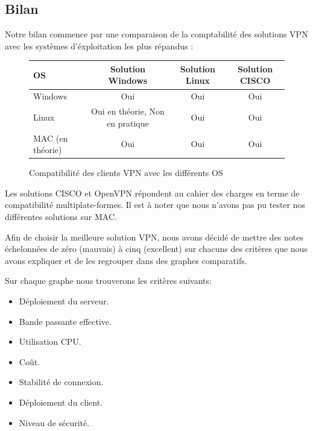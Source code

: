 \subsection{Bilan}

Notre bilan commence par une comparaison de la comptabilité des solutions VPN avec les systèmes d'éxploitation les plus répandus :

\begin{figure}[H]
	\begin{center}
\begin{tabular}{l|c|c|c}
OS & Solution Windows & Solution Linux & Solution CISCO \\
\hline
Windows & Oui & Oui & Oui \\
Linux & Oui en théorie, Non en pratique & Oui & Oui \\
MAC (en théorie) & Oui & Oui & Oui \\
\end{tabular}
	\end{center}
	\caption{Compatibilité des clients VPN avec les différents OS}
	\label{Compatibilité_des_OS}
\end{figure}

Les solutions CISCO et OpenVPN répondent au cahier des charges en terme de compatibilité multiplate-formes. Il est à noter que nous n'avons pas pu tester nos différentes solutions sur MAC.

Afin de choisir la meilleure solution VPN, nous avons décidé de mettre des notes échelonnées de zéro (mauvais) à cinq (excellent) sur chacuns des critères que nous avons expliquer et de les regrouper dans des graphes comparatifs.

Sur chaque graphe nous trouverons les critères suivants:
\begin{itemize}
 	\item Déploiement du serveur.
 	\item Bande passante effective.
 	\item Utilisation CPU.
 	\item Coût.
 	\item Stabilité de connexion.
 	\item Déploiement du client.
	\item Niveau de sécurité.
\end{itemize}


